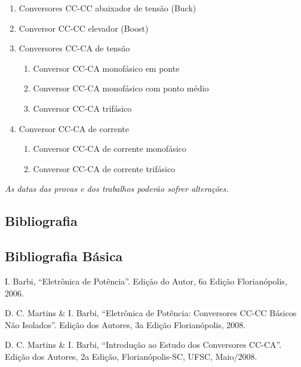 \documentclass[
	article,			%
	12pt,				%
	twoside,			%
	a4paper,			%
	english,			%
	brazil,				%
	sumario=tradicional
]{abntex2-modelo-plano-de-aula}
\begin{document}
\begin{enumerate}      	
	
	\item  Conversores CC-CC abaixador de tensão (Buck)    	
	
	\item Conversor CC-CC elevador (Boost)       	
	
	\item Conversores CC-CA de tensão       
	
	\begin{enumerate}
		\item Conversor CC-CA monofásico em ponte
		\item  Conversor CC-CA monofásico com ponto médio
		\item  Conversor CC-CA trifásico
	\end{enumerate} 
	
	\item Conversor CC-CA de corrente
	\begin{enumerate}
		\item  Conversor CC-CA de corrente monofásico
		\item  Conversor CC-CA de corrente trifásico
	\end{enumerate}   	
\end{enumerate} 	




\emph{As datas das provas e dos trabalhos poderão sofrer alterações.} 



\begin{mdframed}[style=mdfexample2]	\center
	\section{Bibliografia}
\end{mdframed}

\subsection{Bibliografia Básica}




I. Barbi, “Eletrônica de Potência”. Edição do Autor, 6a Edição Florianópolis,
2006.

D. C. Martins \& I. Barbi, “Eletrônica de Potência: Conversores CC-CC Básicos
Não Isolados”. Edição dos Autores, 3a Edição Florianópolis, 2008.

D. C. Martins \& I. Barbi, “Introdução ao Estudo dos Conversores CC-CA”.
Edição dos Autores, 2a Edição, Florianópolis-SC, UFSC, Maio/2008.
\end{document}
